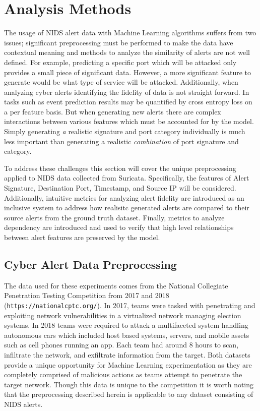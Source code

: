 \chapter{Analysis Methods}


The usage of NIDS alert data with Machine Learning algorithms suffers from two issues; significant preprocessing must be performed to make the data have contextual meaning and methods to analyze the similarity of alerts are not well defined. For example, predicting a specific port which will be attacked only provides a small piece of significant data. However, a more significant feature to generate would be what type of service will be attacked. Additionally, when analyzing cyber alerts identifying the fidelity of data is not straight forward. In tasks such as event prediction results may be quantified by cross entropy loss on a per feature basis. But when generating new alerts there are complex interactions between various features which must be accounted for by the model. Simply generating \emph{a} realistic signature and port category individually is much less important than generating a realistic \emph{combination} of port signature and category. 

To address these challenges this section will cover the unique preprocessing applied to NIDS data collected from Suricata. Specifically, the features of Alert Signature, Destination Port, Timestamp, and Source IP will be considered. Additionally, intuitive metrics for analyzing alert fidelity are introduced as an inclusive system to address how realisitc generated alerts are compared to their source alerts from the ground truth dataset. Finally, metrics to analyze dependency are introduced and used to verify that high level relationships between alert features are preserved by the model.


\section{Cyber Alert Data Preprocessing}
\label{sec:preproc}

The data used for these experiments comes from the National Collegiate Penetration Testing Competition from 2017 and 2018 (\texttt{https://nationalcptc.org/}). In 2017, teams were tasked with penetrating and exploiting network vulnerabilities in a virtualized network managing election systems. In 2018 teams were required to attack a multifaceted system handling autonomous cars which included host based systems, servers, and mobile assets such as cell phones running an app. Each team had around 8 hours to scan, infiltrate the network, and exfiltrate information from the target. Both datasets provide a unique opportunity for Machine Learning experimentation as they are completely comprised of malicious actions as teams attempt to penetrate the target network. Though this data is unique to the competition it is worth noting that the preprocessing described herein is applicable to any dataset consisting of NIDS alerts.  

